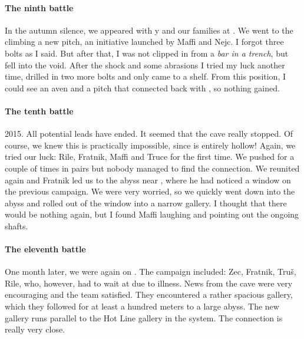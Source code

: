 \paragraph{The ninth battle} In the autumn silence, we appeared with y and our families at . We went to the  climbing a new pitch, an initiative launched by Maffi and Nejc. I forgot three bolts as I said. But after that, I was not clipped in from a \textit{bar in a trench}, but fell into the void. After the shock and some abrasions I tried my luck another time, drilled in two more bolts and only came to a shelf. From this position, I could see an aven and a pitch that connected back with , so nothing gained.

\paragraph {The tenth battle} 2015. All potential leads have ended. It seemed that the cave really stopped. Of course, we knew this is practically impossible, since  is entirely hollow! Again, we tried our luck: Rile, Fratnik, Maffi and Truce for the first time. We pushed for a couple of times in pairs but nobody managed to find the connection. We reunited again and Fratnik led us to the abyss near , where he had noticed a window on the previous campaign. We were very worried, so we quickly went down into the abyss and rolled out of the window into a narrow gallery. I thought that there would be nothing again, but I found Maffi laughing and pointing out the ongoing shafts.

\paragraph {The eleventh battle} One month later, we were again on . The campaign included: Zec, Fratnik, Truš, Rile, who, however, had to wait at  due to illness. News from the cave were very encouraging and the team satisfied. They encountered a rather spacious gallery, which they followed for at least a hundred meters to a large abyss. The new gallery runs parallel to the Hot Line gallery in the system. The connection is really very close.


